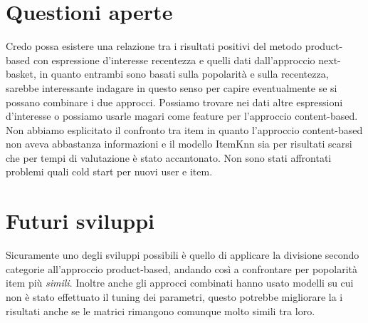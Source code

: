 \section{Questioni aperte}
Credo possa esistere una relazione tra i risultati positivi del metodo product-based con espressione d'interesse recentezza e quelli dati dall'approccio next-basket, in quanto entrambi sono basati sulla popolarità e sulla recentezza, sarebbe interessante indagare in questo senso per capire eventualmente se si possano combinare i due approcci. Possiamo trovare nei dati altre espressioni d'interesse o possiamo usarle magari come feature per l'approccio content-based. Non abbiamo esplicitato il confronto tra item in quanto l'approccio content-based non aveva abbastanza informazioni e il modello ItemKnn sia per risultati scarsi che per tempi di valutazione è stato accantonato. Non sono stati affrontati problemi quali cold start per nuovi user e item.

\section{Futuri sviluppi}
Sicuramente uno degli sviluppi possibili è quello di applicare la divisione secondo categorie all'approccio product-based, andando così a confrontare per popolarità item più \textit{simili}. Inoltre anche gli approcci combinati hanno usato modelli su cui non è stato effettuato il tuning dei parametri, questo potrebbe migliorare la i risultati anche se le matrici rimangono comunque molto simili tra loro.